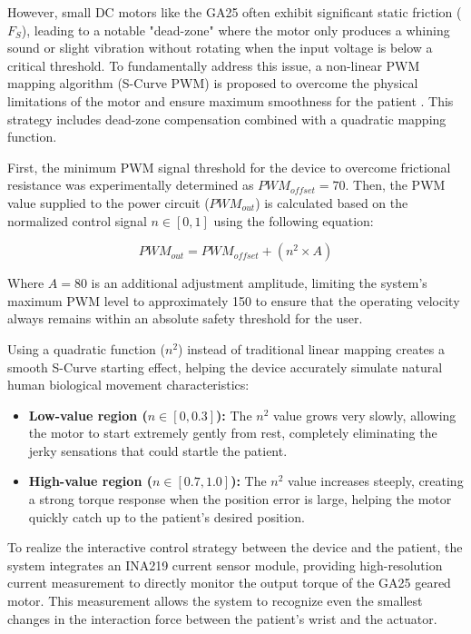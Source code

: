 \documentclass[conference]{IEEEtran}
\begin{document}
However, small DC motors like the GA25 often exhibit significant static friction ($F_S$), leading to a notable "dead-zone" where the motor only produces a whining sound or slight vibration without rotating when the input voltage is below a critical threshold. To fundamentally address this issue, a non-linear PWM mapping algorithm (S-Curve PWM) is proposed to overcome the physical limitations of the motor and ensure maximum smoothness for the patient \cite{pezent2017design}. This strategy includes dead-zone compensation combined with a quadratic mapping function.

First, the minimum PWM signal threshold for the device to overcome frictional resistance was experimentally determined as $PWM_{offset} = 70$. Then, the PWM value supplied to the power circuit ($PWM_{out}$) is calculated based on the normalized control signal $n \in [0, 1]$ using the following equation:

\begin{equation}
PWM_{out} = PWM_{offset} + (n^2 \times A)
\label{eq:scurve_pwm}
\end{equation}

Where $A = 80$ is an additional adjustment amplitude, limiting the system's maximum PWM level to approximately 150 to ensure that the operating velocity always remains within an absolute safety threshold for the user.

Using a quadratic function ($n^2$) instead of traditional linear mapping creates a smooth S-Curve starting effect, helping the device accurately simulate natural human biological movement characteristics:
\begin{itemize}
    \item \textbf{Low-value region ($n \in [0, 0.3]$):} The $n^2$ value grows very slowly, allowing the motor to start extremely gently from rest, completely eliminating the jerky sensations that could startle the patient.
    \item \textbf{High-value region ($n \in [0.7, 1.0]$):} The $n^2$ value increases steeply, creating a strong torque response when the position error is large, helping the motor quickly catch up to the patient's desired position.
\end{itemize}

To realize the interactive control strategy between the device and the patient, the system integrates an INA219 current sensor module, providing high-resolution current measurement to directly monitor the output torque of the GA25 geared motor. This measurement allows the system to recognize even the smallest changes in the interaction force between the patient's wrist and the actuator.
\end{document}
